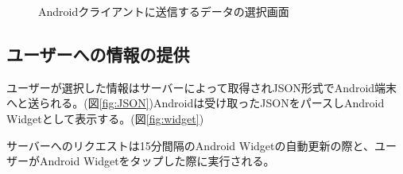 \begin{figure}[htbp]
  \begin{minipage}{\hsize}
    \begin{center}
    \end{center}
    \caption{Androidクライアントに送信するデータの選択画面}
    \label{fig:select}
  \end{minipage}
\end{figure}

\subsection{ユーザーへの情報の提供}
ユーザーが選択した情報はサーバーによって取得されJSON形式でAndroid端末へと送られる。(図\ref{fig:JSON})Androidは受け取ったJSONをパースしAndroid Widgetとして表示する。(図\ref{fig:widget})

サーバーへのリクエストは15分間隔のAndroid Widgetの自動更新の際と、ユーザーがAndroid Widgetをタップした際に実行される。

